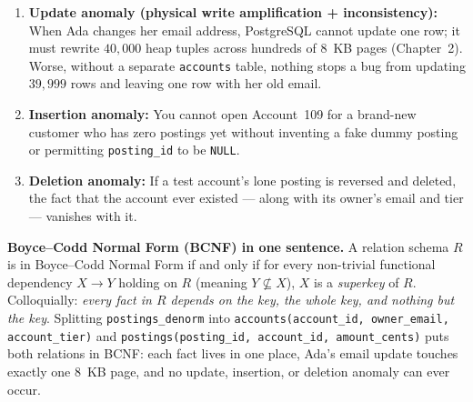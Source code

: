 \begin{enumerate}
  \item \textbf{Update anomaly (physical write amplification + inconsistency):} When Ada changes her email address, PostgreSQL cannot update one row; it must rewrite $40{,}000$ heap tuples across hundreds of 8~KB pages (Chapter~2). Worse, without a separate \texttt{accounts} table, nothing stops a bug from updating $39{,}999$ rows and leaving one row with her old email.
  \item \textbf{Insertion anomaly:} You cannot open Account~109 for a brand-new customer who has zero postings yet without inventing a fake dummy posting or permitting \texttt{posting\_id} to be \texttt{NULL}.
  \item \textbf{Deletion anomaly:} If a test account's lone posting is reversed and deleted, the fact that the account ever existed --- along with its owner's email and tier --- vanishes with it.
\end{enumerate}

\begin{whybox}
\textbf{Boyce--Codd Normal Form (BCNF) in one sentence.} A relation schema $R$ is in Boyce--Codd Normal Form if and only if for every non-trivial functional dependency $X \to Y$ holding on $R$ (meaning $Y \not\subseteq X$), $X$ is a \emph{superkey} of $R$. Colloquially: \emph{every fact in $R$ depends on the key, the whole key, and nothing but the key}. Splitting \texttt{postings\_denorm} into \texttt{accounts(account\_id, owner\_email, account\_tier)} and \texttt{postings(posting\_id, account\_id, amount\_cents)} puts both relations in BCNF: each fact lives in one place, Ada's email update touches exactly one 8~KB page, and no update, insertion, or deletion anomaly can ever occur.
\end{whybox}

